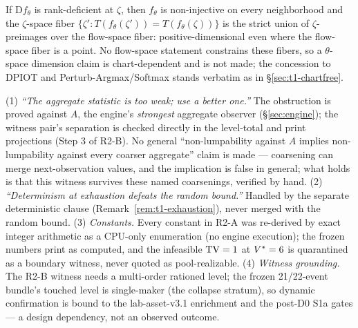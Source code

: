 
\begin{remark}
\label{rem:t1-prongd}
If $\mathrm{D}f_{\theta}$ is rank-deficient at $\zeta$, then
$f_{\theta}$ is non-injective on every neighborhood and the
$\zeta$-space fiber $\{\zeta' : T(f_{\theta}(\zeta')) = T(f_{\theta}
(\zeta))\}$ is the strict union of $\zeta$-preimages over the
flow-space fiber: positive-dimensional even where the flow-space fiber is
a point. No flow-space statement constrains these fibers, so a
$\theta$-space dimension claim is chart-dependent and is not made; the
concession to DPIOT \citep{dpiot2022} and Perturb-Argmax/Softmax
\citep{perturbargmax2024} stands verbatim as in \S\ref{sec:t1-chartfree}.
\end{remark}


\begin{remark}
\label{rem:t1-hostile}
(1) \emph{``The aggregate statistic is too weak; use a better one.''} The
obstruction is proved against $A$, the engine's \emph{strongest} aggregate
observer (\S\ref{sec:engine}); the witness pair's separation is checked
directly in the level-total and print projections (Step 3 of R2-B). No
general ``non-lumpability against $A$ implies non-lumpability against every
coarser aggregate'' claim is made --- coarsening can merge next-observation
values, and the implication is false in general; what holds is that this
witness survives these named coarsenings, verified by hand.
(2) \emph{``Determinism at exhaustion defeats the random bound.''} Handled
by the separate deterministic clause (Remark~\ref{rem:t1-exhaustion}),
never merged with the random bound.
(3) \emph{Constants.} Every constant in R2-A was re-derived by exact
integer arithmetic as a CPU-only enumeration (no engine execution); the
frozen numbers print as computed, and the infeasible $\operatorname{TV} = 1$ at
$V^{*} = 6$ is quarantined as a boundary witness, never quoted as
pool-realizable.
(4) \emph{Witness grounding.} The R2-B witness needs a multi-order
rationed level; the frozen 21/22-event bundle's touched level is
single-maker (the collapse stratum), so dynamic confirmation is bound to
the lab-asset-v3.1 enrichment and the post-D0 S1a gates --- a design
dependency, not an observed outcome.
\end{remark}

